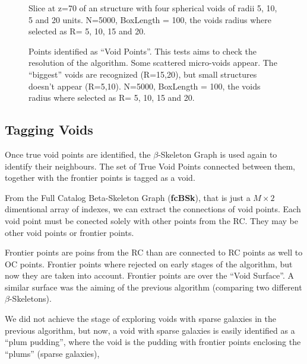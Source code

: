 \documentclass[preprint]{aastex62}
\begin{document}
\begin{figure}
  \caption{Slice at z=70 of an structure with four
    spherical voids of radii 5, 10, 5 and 20 units.
    N=5000, BoxLength = 100, the voids radius where selected as R= 5, 10, 15
    and 20.
    \label{fig:slice for multiple spherical voids}}
\end{figure}



\begin{figure}
  \caption{Points identified as ``Void Points''. This tests aims to check
    the resolution of the algorithm. Some scattered micro-voids appear.
    The ``biggest'' voids are recognized (R=15,20), but small structures doesn't
    appear (R=5,10).
    N=5000, BoxLength = 100, the voids radius where selected as R= 5, 10, 15
    and 20.
    \label{Testing multiple spherical voids}}
\end{figure}





\subsection{Tagging Voids}

Once true void points are identified, the $\beta$-Skeleton Graph is used
again to identify their neighbours. The set of True Void Points connected
between them, together with the frontier points is tagged as a void.

From the Full Catalog Beta-Skeleton Graph (\textbf{fcBSk}), that is just a
$M \times2$ dimentional array of indexes,
we can extract the connections of void points. Each void point
must be conected solely with other points from the RC. They may be other
void points or frontier points.

Frontier points are poins from the RC than
are connected to RC points as well to OC points. Frontier points where
rejected on early stages of the algorithm, but now they are taken into account.
Frontier points are over the ``Void Surface''. A similar surface was the aiming
of the previous algorithm (comparing two different $\beta$-Skeletons).

We did not achieve the stage of exploring voids with sparse galaxies in the
previous algorithm, but now, a void with sparse galaxies is easily identified
as a ``plum pudding'', where the void is the pudding with frontier points
enclosing the ``plums'' (sparse galaxies), 
\end{document}
